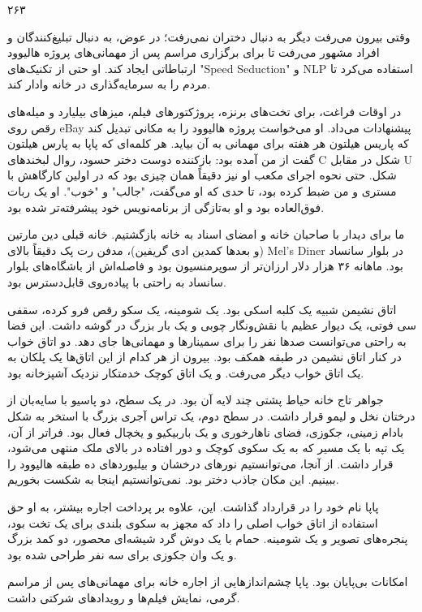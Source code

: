 ۲۶۳

وقتی بیرون می‌رفت دیگر به دنبال دختران نمی‌رفت؛ در عوض، به دنبال تبلیغ‌کنندگان و افراد مشهور می‌رفت تا برای برگزاری مراسم پس از مهمانی‌های پروژه هالیوود ارتباطاتی ایجاد کند. او حتی از تکنیک‌های "Speed Seduction" و NLP استفاده می‌کرد تا مردم را به سرمایه‌گذاری در خانه وادار کند.

در اوقات فراغت، برای تخت‌های برنزه، پروژکتورهای فیلم، میزهای بیلیارد و میله‌های رقص روی eBay پیشنهادات می‌داد. او می‌خواست پروژه هالیوود را به مکانی تبدیل کند که پاریس هیلتون هر هفته برای مهمانی به آن بیاید. هر کلمه‌ای که پاپا به پارس هیلتون گفت از من آمده بود: بازکننده دوست دختر حسود، روال لبخند‌های C شکل در مقابل U شکل. حتی نحوه اجرای مکعب او نیز دقیقاً همان چیزی بود که در اولین کارگاهش با مستری و من ضبط کرده بود، تا حدی که او می‌گفت، "جالب" و "خوب". او یک ربات فوق‌العاده بود و او به‌تازگی از برنامه‌نویس خود پیشرفته‌تر شده بود.

ما برای دیدار با صاحبان خانه و امضای اسناد به خانه بازگشتیم. خانه قبلی دین مارتین (و بعدها کمدین ادی گریفین)، مدفن رت پک دقیقاً بالای Mel's Diner در بلوار سانساد بود. ماهانه ۳۶ هزار دلار ارزان‌تر از سوپرمنسیون بود و فاصله‌اش از باشگاه‌های بلوار سانساد به راحتی با پیاده‌روی قابل‌دسترس بود.

اتاق نشیمن شبیه یک کلبه اسکی بود. یک شومینه، یک سکو رقص فرو کرده، سقفی سی فوتی، یک دیوار عظیم با نقش‌ونگار چوبی و یک بار بزرگ در گوشه داشت. این فضا به راحتی می‌توانست صدها نفر را برای سمینارها و مهمانی‌ها جای دهد. دو اتاق خواب در کنار اتاق نشیمن در طبقه همکف بود. بیرون از هر کدام از این اتاق‌ها یک پلکان به یک اتاق خواب دیگر می‌رفت. و یک اتاق کوچک خدمتکار نزدیک آشپزخانه بود.

جواهر تاج خانه حیاط پشتی چند لایه آن بود. در یک سطح، دو پاسیو با سایه‌بان از درختان نخل و لیمو قرار داشت. در سطح دوم، یک تراس آجری بزرگ با استخر به شکل بادام زمینی، جکوزی، فضای ناهارخوری و یک باربیکیو و یخچال فعال بود. فراتر از آن، یک تپه با یک مسیر که به یک سکوی کوچک و دور افتاده در بالای ملک منتهی می‌شود، قرار داشت. از آنجا، می‌توانستیم نورهای درخشان و بیلبوردهای ده طبقه هالیوود را ببینیم. این مکان جاذب دختر بود. نمی‌توانستیم اینجا به شکست بخوریم.

پاپا نام خود را در قرارداد گذاشت. این، علاوه بر پرداخت اجاره بیشتر، به او حق استفاده از اتاق خواب اصلی را داد که مجهز به سکوی بلندی برای یک تخت بود، پنجره‌های تصویر و یک شومینه. حمام با یک دوش گرد شیشه‌ای محصور، دو کمد بزرگ و یک وان جکوزی برای سه نفر طراحی شده بود.

امکانات بی‌پایان بود. پاپا چشم‌اندازهایی از اجاره خانه برای مهمانی‌های پس از مراسم گرمی، نمایش فیلم‌ها و رویدادهای شرکتی داشت.

